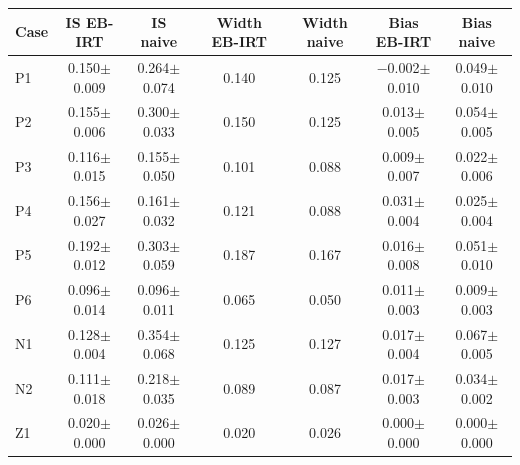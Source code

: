 \begin{tabular}{lcccccc}
\toprule
Case & IS EB-IRT & IS naive & Width EB-IRT & Width naive & Bias EB-IRT & Bias naive \\
\midrule
P1 & 0.150$\pm$0.009 & 0.264$\pm$0.074 & 0.140 & 0.125 & $-$0.002$\pm$0.010 & 0.049$\pm$0.010 \\
P2 & 0.155$\pm$0.006 & 0.300$\pm$0.033 & 0.150 & 0.125 & 0.013$\pm$0.005 & 0.054$\pm$0.005 \\
P3 & 0.116$\pm$0.015 & 0.155$\pm$0.050 & 0.101 & 0.088 & 0.009$\pm$0.007 & 0.022$\pm$0.006 \\
P4 & 0.156$\pm$0.027 & 0.161$\pm$0.032 & 0.121 & 0.088 & 0.031$\pm$0.004 & 0.025$\pm$0.004 \\
P5 & 0.192$\pm$0.012 & 0.303$\pm$0.059 & 0.187 & 0.167 & 0.016$\pm$0.008 & 0.051$\pm$0.010 \\
P6 & 0.096$\pm$0.014 & 0.096$\pm$0.011 & 0.065 & 0.050 & 0.011$\pm$0.003 & 0.009$\pm$0.003 \\
N1 & 0.128$\pm$0.004 & 0.354$\pm$0.068 & 0.125 & 0.127 & 0.017$\pm$0.004 & 0.067$\pm$0.005 \\
N2 & 0.111$\pm$0.018 & 0.218$\pm$0.035 & 0.089 & 0.087 & 0.017$\pm$0.003 & 0.034$\pm$0.002 \\
Z1 & 0.020$\pm$0.000 & 0.026$\pm$0.000 & 0.020 & 0.026 & 0.000$\pm$0.000 & 0.000$\pm$0.000 \\
\bottomrule
\end{tabular}
